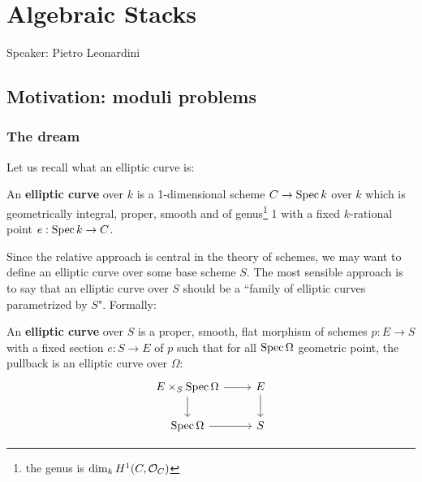\chapter{Algebraic Stacks}
\begin{center}
	{\huge Speaker: Pietro Leonardini}
\end{center}
\bigskip

\section{Motivation: moduli problems}
\subsection{The dream}
Let us recall what an elliptic curve is:
\begin{definition}
An \textbf{elliptic curve} over $k$ is a 1-dimensional scheme $C\to \operatorname{Spec} k$ over $k$ which is geometrically integral, proper, smooth and of genus\footnote{the genus is $\dim_k H^1(C,\mathcal{O}_C)$} 1 with a fixed $k$-rational point $e:\operatorname{Spec} k\to C$.
\end{definition}

Since the relative approach is central in the theory of schemes, we may want to define an elliptic curve over some base scheme $S$. The most sensible approach is to say that an elliptic curve over $S$ should be a ``family of elliptic curves parametrized by $S$". Formally:

\begin{definition}
An \textbf{elliptic curve} over $S$ is a proper, smooth, flat morphism of schemes $p:E\to S$ with a fixed section $e:S\to E$ of $p$ such that for all $\operatorname{Spec} \Omega$ geometric point, the pullback is an elliptic curve over $\Omega$:
\[\begin{tikzcd}
	{E\times_S\Spec\Omega } & E \\
	{\Spec \Omega} & S
	\arrow[from=1-1, to=1-2]
	\arrow[from=1-1, to=2-1]
	\arrow[from=1-2, to=2-2]
	\arrow[from=2-1, to=2-2]
\end{tikzcd}\]
\end{definition}

